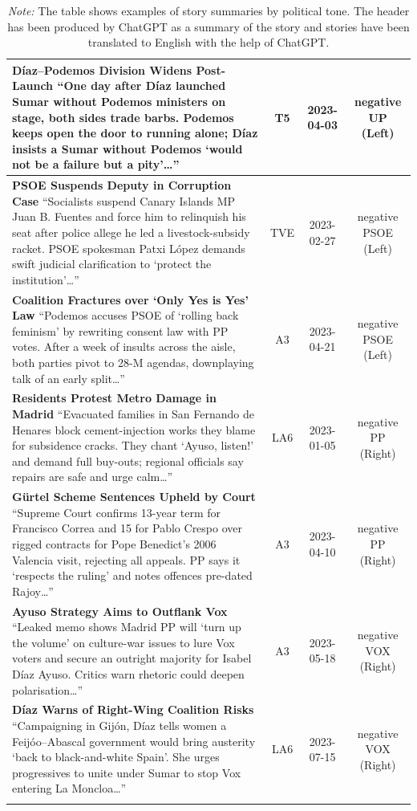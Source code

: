 \documentclass[12pt]{article}
\begin{document}
\begin{longtable}{|p{8cm}|c|c|c|}
	\hline
	\textbf{Díaz–Podemos Division Widens Post-Launch}\newline
	{\scriptsize
		“One day after Díaz launched Sumar without Podemos ministers on stage, both sides trade barbs.  
		Podemos keeps open the door to running alone; Díaz insists a Sumar without Podemos ‘would not be a failure but a pity’…”}
	& T5 & 2023-04-03 & negative UP (Left)\\
	\hline
	\textbf{PSOE Suspends Deputy in Corruption Case}\newline
	{\scriptsize
		“Socialists suspend Canary Islands MP Juan B. Fuentes and force him to relinquish his seat after police allege he led a livestock-subsidy racket.  
		PSOE spokesman Patxi López demands swift judicial clarification to ‘protect the institution’…”}
	& TVE & 2023-02-27 & negative PSOE (Left)\\
	\hline
	\textbf{Coalition Fractures over ‘Only Yes is Yes’ Law}\newline
	{\scriptsize
		“Podemos accuses PSOE of ‘rolling back feminism’ by rewriting consent law with PP votes.  
		After a week of insults across the aisle, both parties pivot to 28-M agendas, downplaying talk of an early split…”}
	& A3 & 2023-04-21 & negative PSOE (Left)\\
	\hline
	\textbf{Residents Protest Metro Damage in Madrid}\newline
	{\scriptsize
		“Evacuated families in San Fernando de Henares block cement-injection works they blame for subsidence cracks.  
		They chant ‘Ayuso, listen!’ and demand full buy-outs; regional officials say repairs are safe and urge calm…”}
	& LA6 & 2023-01-05 & negative PP (Right)\\
	\hline
	\textbf{Gürtel Scheme Sentences Upheld by Court}\newline
	{\scriptsize
		“Supreme Court confirms 13-year term for Francisco Correa and 15 for Pablo Crespo over rigged contracts for Pope Benedict’s 2006 Valencia visit, rejecting all appeals.  
		PP says it ‘respects the ruling’ and notes offences pre-dated Rajoy…”}
	& A3 & 2023-04-10 & negative PP (Right)\\
	\hline
	\textbf{Ayuso Strategy Aims to Outflank Vox}\newline
	{\scriptsize
		“Leaked memo shows Madrid PP will ‘turn up the volume’ on culture-war issues to lure Vox voters and secure an outright majority for Isabel Díaz Ayuso.  
		Critics warn rhetoric could deepen polarisation…”}
	& A3 & 2023-05-18 & negative VOX (Right)\\
	\hline
	\textbf{Díaz Warns of Right-Wing Coalition Risks}\newline
	{\scriptsize
		“Campaigning in Gijón, Díaz tells women a Feijóo–Abascal government would bring austerity ‘back to black-and-white Spain’.  
		She urges progressives to unite under Sumar to stop Vox entering La Moncloa…”}
	& LA6 & 2023-07-15 & negative VOX (Right)\\
	\hline
	\caption*{\small \textit{Note:} The table shows examples of story summaries by political tone. The header has been produced by ChatGPT as a summary of the story and stories have been translated to English with the help of ChatGPT.}
\end{longtable}
\end{document}
